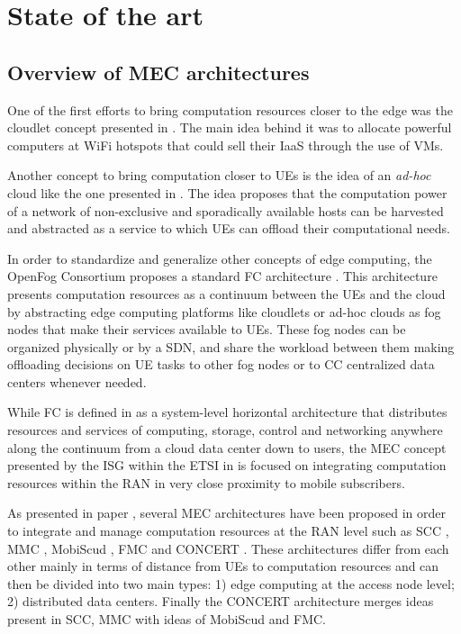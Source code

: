 \chapter{State of the art}
\label{chap:stateoftheart}
\section{Overview of \acrshort{MEC} architectures} \label{section:MECarch}

\noindent One of the first efforts to bring computation resources closer to the edge was the cloudlet concept presented in \cite{cloudlet}. The main idea behind it was to allocate powerful computers at WiFi hotspots that could sell their \acrfull{IaaS} through the use of \acrfull{VMs}.

Another concept to bring computation closer to \acrshort{UE}s is the idea of an \emph{ad-hoc} cloud like the one presented in \cite{adhoc}. The idea proposes that the computation power of a network of non-exclusive and sporadically available hosts can be harvested and abstracted as a service to which \acrshort{UE}s can offload their computational needs.

In order to standardize and generalize other concepts of edge computing, the OpenFog Consortium proposes a standard \acrfull{FC} architecture \cite{OpenFog}. This architecture presents computation resources as a continuum between the \acrshort{UE}s and the cloud by abstracting edge computing platforms like cloudlets or ad-hoc clouds as fog nodes that make their services available to \acrshort{UE}s. These fog nodes can be organized physically or by a \acrfull{SDN}, and share the workload between them making offloading decisions on \acrshort{UE} tasks to other fog nodes or to \acrshort{CC} centralized data centers whenever needed. 

While \acrshort{FC} is defined in \cite{OpenFog} as a system-level horizontal architecture that distributes resources and services of computing, storage, control and networking anywhere along the continuum from a cloud data center down to users, the \acrfull{MEC} concept presented by the \acrfull{ISG} within the \acrfull{ETSI} in \cite{MECspec} is focused on integrating computation resources within the \acrfull{RAN} in very close proximity to mobile subscribers.

As presented in paper \cite{SHAKARAMI2020107496}, several \acrshort{MEC} architectures have been proposed in order to integrate and manage computation resources at the \acrshort{RAN} level such as \acrfull{SCC} \cite{smallcellcloud}, \acrfull{MMC} \cite{mmcloud}, \acrfull{MobiScud} \cite{MobiScud}, \acrfull{FMC} \cite{fmcloud} and CONCERT \cite{CONCERT}. These architectures differ from each other mainly in terms of distance from \acrshort{UE}s to computation resources and can then be divided into two main types: 1) edge computing at the access node level; 2) distributed data centers. Finally the CONCERT architecture merges ideas present in \acrshort{SCC}, \acrshort{MMC} with ideas of \acrshort{MobiScud} and \acrshort{FMC}.

